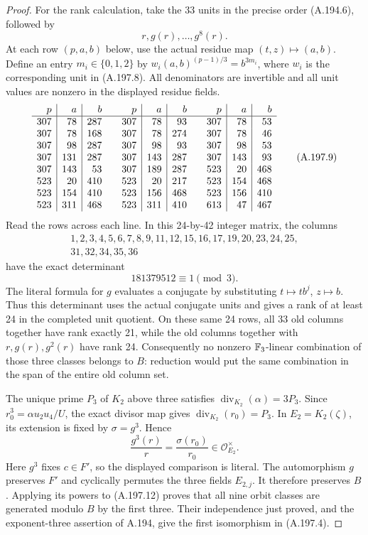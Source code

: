 \begin{proof}
For the rank calculation, take the 33 units in the precise
order (A.194.6), followed by
\[
                       r,g(r),\ldots,g^8(r).
\tag{A.197.8}
\]
At each row \((p,a,b)\) below, use the actual residue map
\((t,z)\mapsto(a,b)\).  Define an entry \(m_i\in\{0,1,2\}\)
by \(w_i(a,b)^{(p-1)/3}=b^{3m_i}\), where \(w_i\)
is the corresponding unit in (A.197.8).
All denominators are invertible and all unit values are
nonzero in the displayed residue fields.
\[
\begin{array}{r|r|r@{\qquad}r|r|r@{\qquad}r|r|r}
 p&a&b&p&a&b&p&a&b\\\hline
307&78&287&307&78&93&307&78&53\\
307&78&168&307&78&274&307&78&46\\
307&98&287&307&98&93&307&98&53\\
307&131&287&307&143&287&307&143&93\\
307&143&53&307&189&287&523&20&468\\
523&20&410&523&20&217&523&154&468\\
523&154&410&523&156&468&523&156&410\\
523&311&468&523&311&410&613&47&467
\end{array}
\tag{A.197.9}
\]
Read the rows across each line.  In this 24-by-42 integer
matrix, the columns
\[
\begin{split}
 1,2,3,4,5,6,7,8,9,11,12,15,16,17,19,20,23,24,25,\\
                         31,32,34,35,36
\end{split}
\tag{A.197.10}
\]
have the exact determinant
\[
                       181379512\equiv1\pmod3.
\tag{A.197.11}
\]
The literal formula for \(g\) evaluates a conjugate by
substituting \(t\mapsto tb^j\), \(z\mapsto b\).
Thus this determinant uses the actual conjugate units and
gives a rank of at least 24 in the completed unit quotient.
On these same 24 rows, all 33 old columns together have
rank exactly 21, while the old columns together with
\(r,g(r),g^2(r)\) have rank 24.  Consequently no nonzero
\(\mathbb F_3\)-linear combination of those three classes belongs
to \(B\): reduction would put the same combination in
the span of the entire old column set.

The unique prime \(P_3\) of \(K_2\) above three satisfies
\(\operatorname{div}_{K_2}(\alpha)=3P_3\).  Since
\(r_0^3=\alpha u_2u_4/U\), the exact divisor map gives
\(\operatorname{div}_{K_2}(r_0)=P_3\).
In \(E_2=K_2(\zeta)\), its extension is fixed by
\(\sigma=g^3\).  Hence
\[
             \frac{g^3(r)}{r}
                   =\frac{\sigma(r_0)}{r_0}
                       \in\mathcal O_{E_2}^{\times}.
\tag{A.197.12}
\]
Here \(g^3\) fixes \(c\in F'\), so the displayed
comparison is literal.  The automorphism \(g\) preserves
\(F'\) and cyclically permutes the three fields \(E_{2,j}\).
It therefore preserves \(B\).  Applying its powers to
(A.197.12) proves that all nine orbit classes are generated
modulo \(B\) by the first three.  Their independence just
proved, and the exponent-three assertion of A.194, give
the first isomorphism in (A.197.4).


\end{proof}
